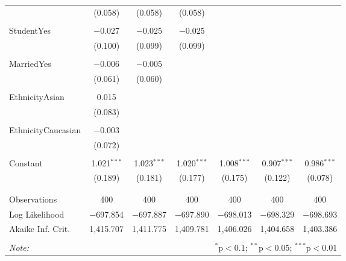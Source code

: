 \documentclass[12pt]{article}
\begin{document}
{\begin{table}[H]
{\begin{tabular}{@{\extracolsep{5pt}}lcccccc}
  & (0.058) & (0.058) & (0.058) &  &  &  \\ 
  & & & & & & \\ 
 StudentYes & $-$0.027 & $-$0.025 & $-$0.025 &  &  &  \\ 
  & (0.100) & (0.099) & (0.099) &  &  &  \\ 
  & & & & & & \\ 
 MarriedYes & $-$0.006 & $-$0.005 &  &  &  &  \\ 
  & (0.061) & (0.060) &  &  &  &  \\ 
  & & & & & & \\ 
 EthnicityAsian & 0.015 &  &  &  &  &  \\ 
  & (0.083) &  &  &  &  &  \\ 
  & & & & & & \\ 
 EthnicityCaucasian & $-$0.003 &  &  &  &  &  \\ 
  & (0.072) &  &  &  &  &  \\ 
  & & & & & & \\ 
 Constant & 1.021$^{***}$ & 1.023$^{***}$ & 1.020$^{***}$ & 1.008$^{***}$ & 0.907$^{***}$ & 0.986$^{***}$ \\ 
  & (0.189) & (0.181) & (0.177) & (0.175) & (0.122) & (0.078) \\ 
  & & & & & & \\ 
\hline \\[-1.8ex] 
Observations & 400 & 400 & 400 & 400 & 400 & 400 \\ 
Log Likelihood & $-$697.854 & $-$697.887 & $-$697.890 & $-$698.013 & $-$698.329 & $-$698.693 \\ 
Akaike Inf. Crit. & 1,415.707 & 1,411.775 & 1,409.781 & 1,406.026 & 1,404.658 & 1,403.386 \\ 
\hline 
\hline \\[-1.8ex] 
\textit{Note:}  & \multicolumn{6}{r}{$^{*}$p$<$0.1; $^{**}$p$<$0.05; $^{***}$p$<$0.01} \\ 
\end{tabular} 
}
\end{table} 

}
\end{document}
